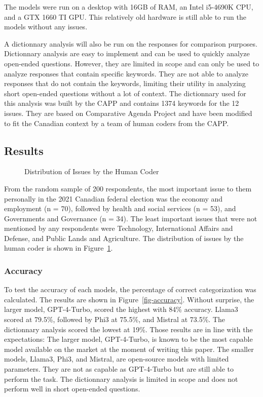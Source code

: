 \documentclass[
  authoryear,
  preprint,
  3p]{elsarticle}
\begin{document}
The models were run on a desktop with 16GB of RAM, an Intel i5-4690K
CPU, and a GTX 1660 TI GPU. This relatively old hardware is still able
to run the models without any issues.

A dictionnary analysis will also be run on the responses for comparison
purposes. Dictionnary analysis are easy to implement and can be used to
quickly analyze open-ended questions. However, they are limited in scope
and can only be used to analyze responses that contain specific
keywords. They are not able to analyze responses that do not contain the
keywords, limiting their utility in analyzing short open-ended questions
without a lot of context. The dictionnary used for this analysis was
built by the CAPP and contains 1374 keywords for the 12 issues. They are
based on \citet{sevenans_etal14} Comparative Agenda Project and have
been modified to fit the Canadian context by a team of human coders from
the CAPP.

\subsection{Results}\label{results}

\begin{figure}


\caption{\label{fig-distribution}Distribution of Issues by the Human
Coder}

\end{figure}%

From the random sample of 200 respondents, the most important issue to
them personally in the 2021 Canadian federal election was the economy
and employment (n = 70), followed by health and social services (n =
53), and Governments and Governance (n = 34). The least important issues
that were not mentioned by any respondents were Technology,
International Affairs and Defense, and Public Lands and Agriculture. The
distribution of issues by the human coder is shown in
Figure~\ref{fig-distribution}.

\subsubsection{Accuracy}\label{accuracy}

To test the accuracy of each models, the percentage of correct
categorization was calculated. The results are shown in
Figure~\ref{fig-accuracy}. Without surprise, the larger model,
GPT-4-Turbo, scored the highest with 84\% accuracy. Llama3 scored at
79.5\%, followed by Phi3 at 75.5\%, and Mistral at 73.5\%. The
dictionnary analysis scored the lowest at 19\%. Those results are in
line with the expectations: The larger model, GPT-4-Turbo, is known to
be the most capable model available on the market at the moment of
writing this paper. The smaller models, Llama3, Phi3, and Mistral, are
open-source models with limited parameters. They are not as capable as
GPT-4-Turbo but are still able to perform the task. The dictionnary
analysis is limited in scope and does not perform well in short
open-ended questions.
\end{document}
